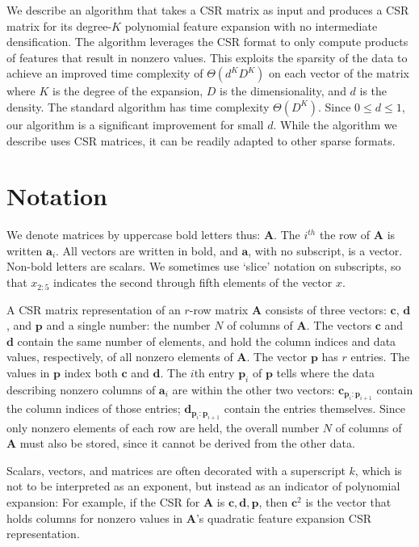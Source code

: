 \documentclass[journal]{journal}
\begin{document}
We describe an algorithm that takes a CSR matrix as input and produces a CSR matrix for its degree-$K$ polynomial feature expansion with no intermediate densification.
The algorithm leverages the CSR format to only compute products of features that result in nonzero values.
This exploits the sparsity of the data to achieve an improved time complexity of $\Theta(d^KD^K)$ on each vector of the matrix where $K$ is the degree of the expansion, $D$ is the dimensionality, and $d$ is the density.
The standard algorithm has time complexity $\Theta(D^K)$.
Since $0 \le d \le 1$, our algorithm is a significant improvement for small $d$.
While the algorithm we describe uses CSR matrices, it can be readily adapted to other sparse formats.

\section{Notation}
We denote matrices by uppercase bold letters thus: $\bm{A}$. 
The $i^{th}$ the row of $\bm{A}$ is written $\bm{a}_i$. All vectors are written in bold, and  $\bm{a}$, with no subscript, is a vector. Non-bold letters are scalars. We sometimes use `slice' notation on subscripts, so that $x_{2:5}$ indicates the second through fifth elements of the vector $x$.

A CSR matrix representation of an $r$-row matrix $\bm{A}$ consists of three vectors: $\bm{c}$, $\bm{d}$, and $\bm{p}$ and a single number: the number $N$ of columns of $\bm{A}$. The vectors
$\bm{c}$ and $\bm{d}$ contain the same number of elements, and hold the column indices and data values, respectively, of all nonzero elements of $\bm{A}$.
The vector $\bm{p}$ has $r$ entries. The values in $\bm{p}$ index both $\bm{c}$ and $\bm{d}$. The $i$th entry $\bm{p}_i$ of $\bm{p}$ tells where
the data describing nonzero columns of $\bm{a}_i$ are within the other two vectors: $\bm{c}_{\bm{p}_i:\bm{p}_{i+1}}$ contain the column indices of those entries; $\bm{d}_{\bm{p}_i:\bm{p}_{i+1}}$ contain the entries themselves.
Since only nonzero elements of each row are held, the overall number $N$ of columns of $\bm{A}$  must also be stored, since it cannot be derived
from the other data.

Scalars, vectors, and matrices are often decorated with a superscript $k$, which is not to be interpreted as an exponent, but instead as an indicator of polynomial expansion: 
For example, if the CSR for $\bm{A}$ is $\bm{c}, \bm{d}, \bm{p}$, then $\bm{c}^2$ is the vector that holds columns for nonzero values in $\bm{A}$'s quadratic feature expansion CSR representation.
\end{document}
